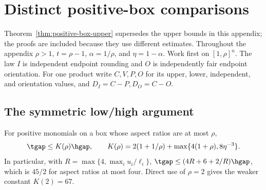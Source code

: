 \section{Distinct positive-box comparisons}\label{app:positive-box-predecessors}
Theorem~\ref{thm:positive-box-upper} supersedes the upper bounds in this
appendix; the proofs are included because they use different estimates.
Throughout the appendix $\rho>1$, $t=\rho-1$, $\alpha=1/\rho$, and
$\eta=1-\alpha$. Work first on $[1,\rho]^n$. The law $I$ is independent
endpoint rounding and $O$ is independently fair endpoint orientation.
For one product write $C,V,P,O$ for its upper, lower, independent,
and orientation values, and $D_I=C-P,D_O=C-O$.

\subsection{The symmetric low/high argument}
\begin{proposition}\label{prop:coarse-box}
For positive monomials on a box whose aspect ratios are at most $\rho$,
\[
 \tgap\le K(\rho)\hgap,\qquad
 K(\rho)=2(1+1/\rho)+\max\{4(1+\rho),8\eta^{-3}\}.
\]
In particular, with $R=\max\{4,\max_i u_i/\ell_i\}$,
$\tgap\le(4R+6+2/R)\hgap$, which is $45/2$ for aspect ratios at most
four. Direct use of $\rho=2$ gives the weaker constant $K(2)=67$.
\end{proposition}
